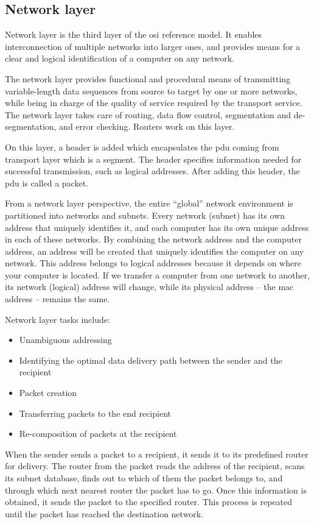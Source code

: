 \subsection{Network layer}

Network layer is the third layer of the \acrshort{osi} reference model. It enables interconnection of multiple networks into larger ones, and provides means for a clear and logical identification of a computer on any network.

The network layer provides functional and procedural means of transmitting variable-length data sequences from source to target by one or more networks, while being in charge of the quality of service required by the transport service. The network layer takes care of routing, data flow control, segmentation and de-segmentation, and error checking. Routers work on this layer.

On this layer, a header is added which encapsulates the  \acrfull{pdu} coming from transport layer which is a segment. The header specifies information needed for successful transmission, such as logical addresses. After adding this header, the \acrshort{pdu} is called a packet.

From a network layer perspective, the entire ``global'' network environment is partitioned into networks and subnets. Every network (subnet) has its own address that uniquely identifies it, and each computer has its own unique address in each of these networks. By combining the network address and the computer address, an address will be created that uniquely identifies the computer on any network. This address belongs to logical addresses because it depends on where your computer is located. If we transfer a computer from one network to another, its network (logical) address will change, while its physical address -- the \acrshort{mac} address -- remains the same.

Network layer tasks include:
\begin{itemize}[noitemsep]
    \item Unambiguous addressing
    \item Identifying the optimal data delivery path between the sender and the recipient
    \item Packet creation
    \item Transferring packets to the end recipient
    \item Re-composition of packets at the recipient
\end{itemize}

When the sender sends a packet to a recipient, it sends it to its predefined router for delivery. The router from the packet reads the address of the recipient, scans its subnet database, finds out to which of them the packet belongs to, and through which next nearest router the packet has to go. Once this information is obtained, it sends the packet to the specified router. This process is repeated until the packet has reached the destination network.

